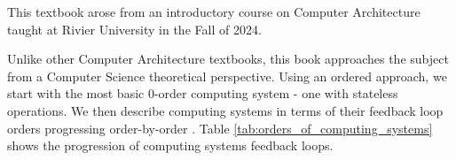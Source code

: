 \documentclass[11pt]{book}
\let\citeold\cite
\let\cite\citep
\let\citep\citeold
\begin{document}
This textbook arose from an introductory course on Computer Architecture taught at Rivier University in the Fall of 2024. %

Unlike other Computer Architecture textbooks, this book approaches the subject from a Computer Science theoretical perspective. Using an ordered approach, we start with the most basic 0-order computing system - one with stateless operations. We then describe computing systems in terms of their feedback loop orders progressing order-by-order \cite{stefan24}. Table \ref{tab:orders_of_computing_systems} shows the  progression of computing systems feedback loops.

\end{document}
